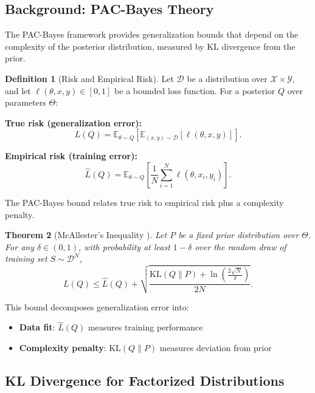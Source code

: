 \documentclass{article}
\theoremstyle{plain}
\newtheorem{theorem}{Theorem}[section]
\theoremstyle{definition}
\newtheorem{definition}[theorem]{Definition}
\theoremstyle{remark}
\begin{document}
\subsection{Background: PAC-Bayes Theory}\label{app:pacbayes:background}

The PAC-Bayes framework provides generalization bounds that depend on the complexity of the posterior distribution, measured by KL divergence from the prior.

\begin{definition}[Risk and Empirical Risk]
\label{def:risk}
Let $\mathcal{D}$ be a distribution over $\mathcal{X} \times \mathcal{Y}$, and let $\ell(\theta, x, y) \in [0, 1]$ be a bounded loss function. For a posterior $Q$ over parameters $\Theta$:

\textbf{True risk (generalization error):}
\[
L(Q) = \mathbb{E}_{\theta \sim Q}\left[\mathbb{E}_{(x,y) \sim \mathcal{D}}[\ell(\theta, x, y)]\right].
\]

\textbf{Empirical risk (training error):}
\[
\hat{L}(Q) = \mathbb{E}_{\theta \sim Q}\left[\frac{1}{N}\sum_{i=1}^{N} \ell(\theta, x_i, y_i)\right].
\]
\end{definition}

The PAC-Bayes bound relates true risk to empirical risk plus a complexity penalty.

\begin{theorem}[McAllester's Inequality \cite{mcallester1998some}]
\label{thm:pacbayes_standard}
Let $P$ be a fixed prior distribution over $\Theta$. For any $\delta \in (0,1)$, with probability at least $1-\delta$ over the random draw of training set $S \sim \mathcal{D}^N$,
\[
L(Q) \leq \hat{L}(Q) + \sqrt{\frac{\mathrm{KL}(Q \| P) + \ln\left(\frac{2\sqrt{N}}{\delta}\right)}{2N}}.
\]
\end{theorem}

This bound decomposes generalization error into:
\begin{itemize}
    \item \textbf{Data fit}: $\hat{L}(Q)$ measures training performance
    \item \textbf{Complexity penalty}: $\mathrm{KL}(Q \| P)$ measures deviation from prior
\end{itemize}

\subsection{KL Divergence for Factorized Distributions}\label{app:pacbayes:kl}
\end{document}
